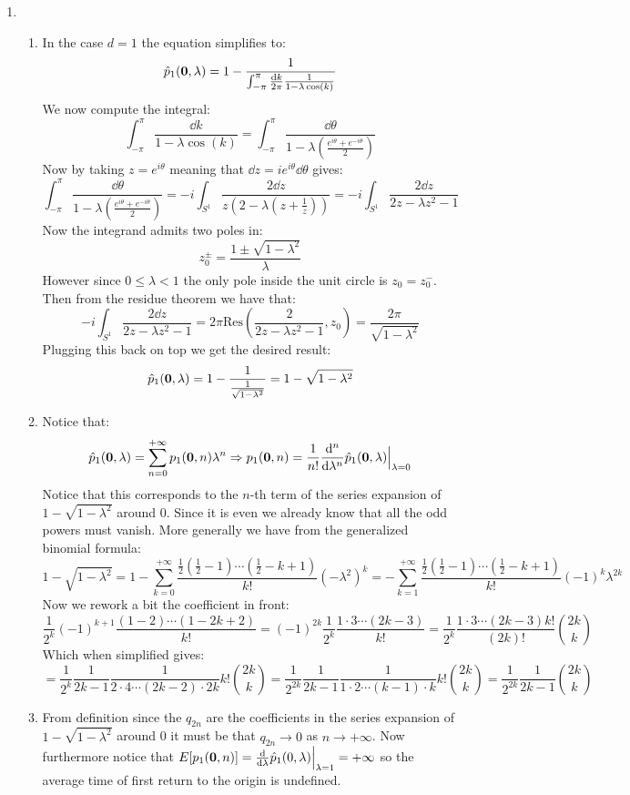 \documentclass[10pt,a4paper]{article}
\begin{document}
\begin{enumerate}
\item 
\begin{enumerate}
\item In the case $d = 1$ the equation simplifies to:
\[
\hat{p}_1(\vb{0}, \lambda) = 1 - \frac{1}{\int_{-\pi}^\pi \frac{\dd k}{2 \pi} \frac{1}{1 - \lambda \cos(k)}} 
\]	
We now compute the integral:
\[
\int_{-\pi}^{\pi} \frac{\dd k}{1 - \lambda \cos(k)} = \int_{-\pi}^{\pi} \frac{\dd \theta}{1 - \lambda \left(\frac{e^{i \theta} + e^{-i\theta}}{2}\right)}
\]
Now by taking $z = e^{i \theta}$ meaning that $\dd z = i e^{i\theta} \dd \theta$ gives:
\[
\int_{-\pi}^{\pi} \frac{\dd \theta}{1 - \lambda \left(\frac{e^{i \theta} + e^{-i\theta}}{2}\right)} = -i\int_{S^1} \frac{2\dd z}{z(2 - \lambda (z + \frac{1}{z})) } = -i \int_{S^1}\frac{2 \dd z}{2z - \lambda z^2 - 1}
\]
Now the integrand admits two poles in:
\[
z_0^{\pm} = \frac{1 \pm \sqrt{1 - \lambda^2}}{\lambda}
\]
However since $0 \leq \lambda < 1$ the only pole inside the unit circle is $z_0 = z_0^-$.  Then from the residue theorem we have that:
\[
-i\int_{S^1} \frac{2 \dd z}{2 z - \lambda z^2 - 1} = 2 \pi  \text{Res}(\frac{2}{2 z - \lambda z^2 - 1}, z_0) = \frac{2\pi}{\sqrt{1 - \lambda^2}}  
\]
Plugging this back on top we get the desired result:
\[
\hat{p}_1(\vb{0}, \lambda) = 1 - \frac{1}{\frac{1}{\sqrt{1 - \lambda^2}}} = 1 - \sqrt{1 - \lambda^2}
\]

\item Notice that:
\[
\hat{p}_1(\vb{0}, \lambda) = \sum_{n = 0}^{+\infty} p_1(\vb{0}, n) \lambda^n \Rightarrow p_1(\vb{0}, n) = \frac{1}{n!} \dv[n]{}{\lambda} \hat{p}_1(\vb{0}, \lambda) \Big|_{\lambda = 0}
\]
Notice that this corresponds to the $n$-th term of the series expansion of $1 - \sqrt{1 - \lambda^2}$ around 0. Since it is even we already know that all the odd powers must vanish. More generally we have from the generalized binomial formula:
\[
1 - \sqrt{1 - \lambda^2} = 1 - \sum_{k = 0}^{+\infty} \frac{\frac{1}{2} (\frac{1}{2} - 1) \cdots (\frac{1}{2} - k + 1) }{k!}(-\lambda^2)^k = - \sum_{k = 1}^{+\infty} \frac{\frac{1}{2} (\frac{1}{2} - 1) \cdots (\frac{1}{2} - k + 1) }{k!}(-1)^k\lambda^{2k}
\]
Now we rework a bit the coefficient in front:
\[
\frac{1}{2^k} (-1)^{k+1} \frac{(1 - 2) \cdots (1 - 2k + 2)}{k!} = (-1)^{2k} \frac{1}{2^k} \frac{1 \cdot 3 \cdots (2k - 3)}{k!} =  \frac{1}{2^k} \frac{1\cdot3\cdots(2k -3) k!}{(2k)!} \binom{2k}{k} 
\]
Which when simplified gives:
\[
= \frac{1}{2^k} \frac{1}{2k - 1} \frac{1}{2 \cdot 4 \cdots (2k - 2) \cdot 2k} k! \binom{2k}{k} = \frac{1}{2^{2k}} \frac{1}{2k - 1} \frac{1}{1 \cdot 2 \cdots (k - 1) \cdot k} k! \binom{2k}{k} = \frac{1}{2^{2k}} \frac{1}{2k - 1} \binom{2k}{k}
\]

\item From definition since the $q_{2n}$ are the coefficients in the series expansion of $1 - \sqrt{1 - \lambda^2}$ around 0 it must be that $q_{2n} \to 0$ as $n \to +\infty$. Now furthermore notice that $E[p_1(\vb{0}, n)] = \dv{}{\lambda} \hat{p}_1(0,\lambda) \Big|_{\lambda = 1} = +\infty$ so the average time of first return to the origin is undefined. 
\end{enumerate}

\end{enumerate}
\end{document}
